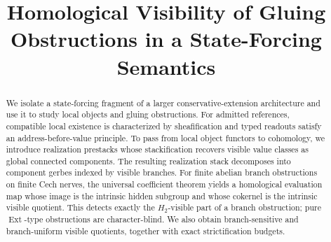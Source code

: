 \documentclass[reqno]{amsart}
\title[Homological Visibility of Gluing Obstructions]{Homological Visibility of Gluing Obstructions in a State-Forcing Semantics}
\author{}
\theoremstyle{definition}
\theoremstyle{remark}
\begin{document}
\begin{abstract}
We isolate a state-forcing fragment of a larger conservative-extension architecture and use it to study local objects and gluing obstructions. For admitted references, compatible local existence is characterized by sheafification and typed readouts satisfy an address-before-value principle. To pass from local object functors to cohomology, we introduce realization prestacks whose stackification recovers visible value classes as global connected components. The resulting realization stack decomposes into component gerbes indexed by visible branches. For finite abelian branch obstructions on finite Cech nerves, the universal coefficient theorem yields a homological evaluation map whose image is the intrinsic hidden subgroup and whose cokernel is the intrinsic visible quotient. This detects exactly the $H_2$-visible part of a branch obstruction; pure $\operatorname{Ext}$-type obstructions are character-blind. We also obtain branch-sensitive and branch-uniform visible quotients, together with exact strictification budgets.
\end{abstract}


\maketitle










\end{document}
